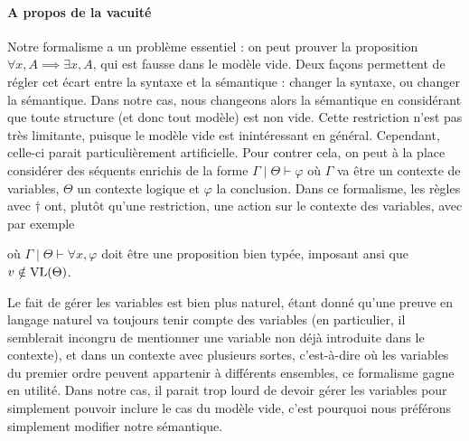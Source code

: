 \paragraph{A propos de la vacuité}
Notre formalisme a un problème essentiel : on peut prouver la proposition
$\forall x, A \implies \exists x, A$, qui est fausse dans le modèle vide. Deux
façons permettent de régler cet écart entre la syntaxe et la sémantique :
changer la syntaxe, ou changer la sémantique. Dans notre cas, nous changeons
alors la sémantique en considérant que toute structure (et donc tout modèle)
est non vide. Cette restriction n'est pas très limitante, puisque le modèle vide
est inintéressant en général. Cependant, celle-ci parait particulièrement
artificielle. Pour contrer cela, on peut à la place considérer des séquents
enrichis de la forme $\Gamma\mid \Theta \vdash \varphi$ où $\Gamma$ va être un
contexte de variables, $\Theta$ un contexte logique et $\varphi$ la conclusion.
Dans ce formalisme, les règles avec $\dagger$ ont, plutôt qu'une restriction,
une action sur le contexte des variables, avec par exemple
\begin{prooftree}
\end{prooftree}
où $\Gamma\mid\Theta\vdash \forall x, \varphi$ doit être une proposition bien
typée, imposant ansi que $v\notin\VL(\Theta)$.

Le fait de gérer les variables est bien plus naturel, étant donné qu'une preuve
en langage naturel va toujours tenir compte des variables (en particulier, il
semblerait incongru de mentionner une variable non déjà introduite dans le
contexte), et dans un contexte avec plusieurs sortes, c'est-à-dire où les
variables du premier ordre peuvent appartenir à différents ensembles, ce
formalisme gagne en utilité. Dans notre cas, il parait trop lourd de devoir
gérer les variables pour simplement pouvoir inclure le cas du modèle vide,
c'est pourquoi nous préférons simplement modifier notre sémantique.


